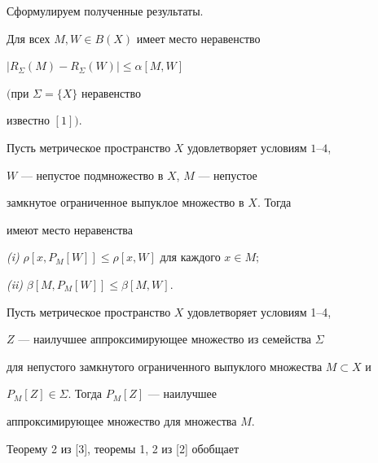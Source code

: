 Сформулируем полученные результаты.





\begin{lem}


Для всех $M, W \in B(X)$ имеет место неравенство


$|R_{\Sigma }(M) - R_{\Sigma }(W)| \leq \alpha [M,W]$


$($при $\Sigma = \{X\}$ неравенство 


известно $[1])$.


\end{lem}





\begin{lem}


Пусть метрическое пространство $X$ удовлетворяет условиям $1$--$4$,


$W$ --- непустое подмножество в $X$, $M$ --- непустое 


замкнутое ограниченное выпуклое множество в $X$. Тогда 


имеют место неравенства





{\em (i)} $\rho [x,P_{M}[W]] \leq \rho [x,W]$ для каждого $x \in M;$ 





{\em (ii)} $\beta [M,P_{M}[W]] \leq \beta [M,W]$.


\end{lem} 





\begin{cor}


Пусть метрическое пространство $X$ удовлетворяет условиям 1--4, 


$Z$ --- наилучшее аппроксимирующее множество из семейства $\Sigma$ 


для непустого замкнутого ограниченного выпуклого множества $M \subset X$ и 


$P_{M}[Z] \in \Sigma$. Тогда $P_{M}[Z]$ --- наилучшее 


аппроксимирующее множество для множества $M$.


\end{cor} 





Теорему 2 из [3], теоремы 1, 2 из [2] обобщает





